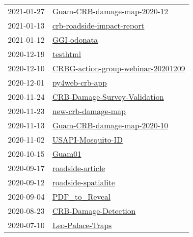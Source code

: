 \begin{longtable}{ll}
2021-01-27 &                   \href{https://github.com/aubreymoore/Guam-CRB-damage-map-2020-12}{Guam-CRB-damage-map-2020-12} \\
2021-01-13 &                     \href{https://github.com/aubreymoore/crb-roadside-impact-report}{crb-roadside-impact-report} \\
2021-01-12 &                                                   \href{https://github.com/aubreymoore/GGI-odonata}{GGI-odonata} \\
2020-12-19 &                                                         \href{https://github.com/aubreymoore/testhtml}{testhtml} \\
2020-12-10 &     \href{https://github.com/aubreymoore/CRBG-action-group-webinar-20201209}{CRBG-action-group-webinar-20201209} \\
2020-12-01 &                                             \href{https://github.com/aubreymoore/py4web-crb-app}{py4web-crb-app} \\
2020-11-24 &                 \href{https://github.com/aubreymoore/CRB-Damage-Survey-Validation}{CRB-Damage-Survey-Validation} \\
2020-11-23 &                                     \href{https://github.com/aubreymoore/new-crb-damage-map}{new-crb-damage-map} \\
2020-11-13 &                   \href{https://github.com/aubreymoore/Guam-CRB-damage-map-2020-10}{Guam-CRB-damage-map-2020-10} \\
2020-11-02 &                                       \href{https://github.com/aubreymoore/USAPI-Mosquito-ID}{USAPI-Mosquito-ID} \\
2020-10-15 &                                                             \href{https://github.com/aubreymoore/Guam01}{Guam01} \\
2020-09-17 &                                         \href{https://github.com/aubreymoore/roadside-article}{roadside-article} \\
2020-09-12 &                                   \href{https://github.com/aubreymoore/roadside-spatialite}{roadside-spatialite} \\
2020-09-04 &                                               \href{https://github.com/aubreymoore/PDF_to_Reveal}{PDF_to_Reveal} \\
2020-08-23 &                                 \href{https://github.com/aubreymoore/CRB-Damage-Detection}{CRB-Damage-Detection} \\
2020-07-10 &                                         \href{https://github.com/aubreymoore/Leo-Palace-Traps}{Leo-Palace-Traps} \\

\end{longtable}
